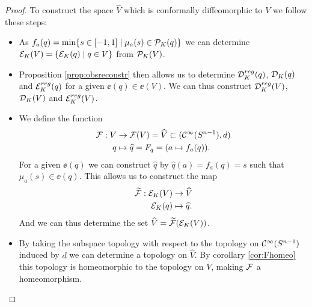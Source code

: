 \begin{proof}
    
    To construct the space $\widehat{V}$ which is conformally diffeomorphic to $V$ we follow these steps:
    \begin{itemize}
        \item As $f_a(q) = \min \{s\in [-1,1] \mid \mu_a(s) \in {\mathcal{P}}_K(q)\}$ we can determine ${\mathcal{E}}_K(V) = \{{{\mathcal{E}}_K}(q) \mid q\in V\}$ from ${\mathcal{P}}_K(V)$.
        \item Proposition \ref{prop:obsreconstr} then allows us to determine ${\mathcal{D}}^{reg}_K(q)$, ${\mathcal{D}}_K(q)$ and ${{\mathcal{E}}^{reg}_K}(q)$ for a given $\ee(q)\in \ee(V)$. We can thus construct ${\mathcal{D}}^{reg}_K(V)$, ${\mathcal{D}}_K(V)$ and ${{\mathcal{E}}^{reg}_K}(V)$.
        \item We define the function 
        \begin{align*}
            \mathcal{F}:V&\to \mathcal{F}(V) = \widehat{V} \subset ({\mathcal{C}}^\infty({S^{n-1}}),d)\\
            q &\mapsto \widehat{q} = F_q = (a\mapsto f_a(q)).
        \end{align*}
        For a given $\ee(q)$ we can construct $\widehat{q}$ by $\widehat{q}(a) = f_a(q) = s$ such that $\mu_a(s) \in \ee(q)$.
        This allows us to construct the map
        \begin{align*}
            \widetilde{\mathcal{F}}:{{\mathcal{E}}_K}(V)&\to \widehat{V}\\
            {{\mathcal{E}}_K}(q) &\mapsto \widehat{q}.
        \end{align*}
        And we can thus determine the set $\widehat{V} = \widetilde{\mathcal{F}}({{\mathcal{E}}_K}(V))$.

        \item By taking the subspace topology with respect to the topology on ${\mathcal{C}}^\infty({S^{n-1}})$ induced by $d$ we can determine a topology on $\widehat{V}$. By corollary \ref{cor:Fhomeo} this topology is homeomorphic to the topology on $V$, making $\mathcal{F}$ a homeomorphism.
        
        

\end{itemize}
\end{proof}
